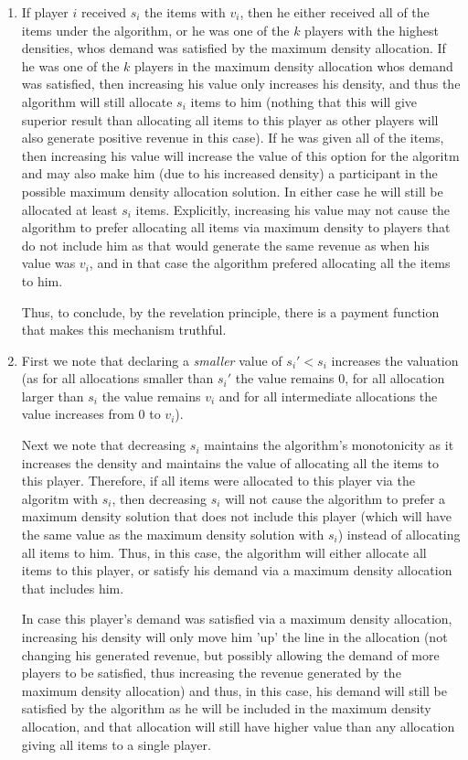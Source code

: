 \documentclass[a4page,notitlepage]{article}
\begin{document}
\begin{enumerate}
\begin{enumerate}
      \item
      If player $i$ received $s_i$ the items with $v_i$, then he either received all of the items under the algorithm, or he was one of the $k$ players with the highest densities, whos demand was satisfied by the maximum density allocation.
      If he was one of the $k$ players in the maximum density allocation whos demand was satisfied, then increasing his value only increases his density, and thus the algorithm will still allocate $s_i$ items to him (nothing that this will give superior result than allocating all items to this player as other players will also generate positive revenue in this case).
      If he was given all of the items, then increasing his value will increase the value of this option for the algoritm and may also make him (due to his increased density) a participant in the possible maximum density allocation solution.
      In either case he will still be allocated at least $s_i$ items.
      Explicitly, increasing his value may not cause the algorithm to prefer allocating all items via maximum density to players that do not include him as that would generate the same revenue as when his value was $v_i$, and in that case the algorithm prefered allocating all the items to him.
      
      Thus, to conclude, by the revelation principle, there is a payment function that makes this mechanism truthful.
      \item
        First we note that declaring a \emph{smaller} value of $s_i'<s_i$ increases the valuation (as for all allocations smaller than $s_i'$ the value remains 0, for all allocation larger than $s_i$ the value remains $v_i$ and for all intermediate allocations the value increases from 0 to $v_i$).

        Next we note that decreasing $s_i$ maintains the algorithm's monotonicity as it increases the density and maintains the value of allocating all the items to this player.
        Therefore, if all items were allocated to this player via the algoritm with $s_i$, then decreasing $s_i$ will not cause the algorithm to prefer a maximum density solution that does not include this player (which will have the same value as the maximum density solution with $s_i$) instead of allocating all items to him.
        Thus, in this case, the algorithm will either allocate all items to this player, or satisfy his demand via a maximum density allocation that includes him.

        In case this player's demand was satisfied via a maximum density allocation, increasing his density will only move him 'up' the line in the allocation (not changing his generated revenue, but possibly allowing the demand of more players to be satisfied, thus increasing the revenue generated by the maximum density allocation) and thus, in this case, his demand will still be satisfied by the algorithm as he will be included in the maximum density allocation, and that allocation will still have higher value than any allocation giving all items to a single player.
        

\end{enumerate}
\end{enumerate}
\end{document}
